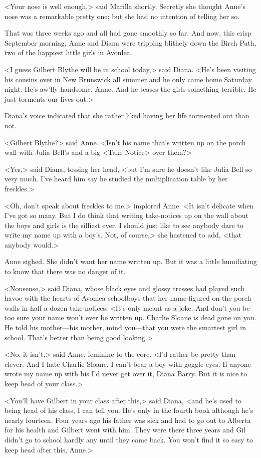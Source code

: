 <Your nose is well enough,> said Marilla shortly. Secretly she thought Anne's nose was a remarkable pretty one; but she had no intention of telling her so.

That was three weeks ago and all had gone smoothly so far. And now, this crisp September morning, Anne and Diana were tripping blithely down the Birch Path, two of the happiest little girls in Avonlea.

<I guess Gilbert Blythe will be in school today,> said Diana. <He's been visiting his cousins over in New Brunswick all summer and he only came home Saturday night. He's aw'fly handsome, Anne. And he teases the girls something terrible. He just torments our lives out.>

Diana's voice indicated that she rather liked having her life tormented out than not.

<Gilbert Blythe?> said Anne. <Isn't his name that's written up on the porch wall with Julia Bell's and a big <Take Notice> over them?>

<Yes,> said Diana, tossing her head, <but I'm sure he doesn't like Julia Bell so very much. I've heard him say he studied the multiplication table by her freckles.>

<Oh, don't speak about freckles to me,> implored Anne. <It isn't delicate when I've got so many. But I do think that writing take-notices up on the wall about the boys and girls is the silliest ever. I should just like to see anybody dare to write my name up with a boy's. Not, of course,> she hastened to add, <that anybody would.>

Anne sighed. She didn't want her name written up. But it was a little humiliating to know that there was no danger of it.

<Nonsense,> said Diana, whose black eyes and glossy tresses had played such havoc with the hearts of Avonlea schoolboys that her name figured on the porch walls in half a dozen take-notices. <It's only meant as a joke. And don't you be too sure your name won't ever be written up. Charlie Sloane is dead gone on you. He told his mother—his mother, mind you—that you were the smartest girl in school. That's better than being good looking.>

<No, it isn't,> said Anne, feminine to the core. <I'd rather be pretty than clever. And I hate Charlie Sloane, I can't bear a boy with goggle eyes. If anyone wrote my name up with his I'd never get over it, Diana Barry. But it is nice to keep head of your class.>

<You'll have Gilbert in your class after this,> said Diana, <and he's used to being head of his class, I can tell you. He's only in the fourth book although he's nearly fourteen. Four years ago his father was sick and had to go out to Alberta for his health and Gilbert went with him. They were there three years and Gil didn't go to school hardly any until they came back. You won't find it so easy to keep head after this, Anne.>

